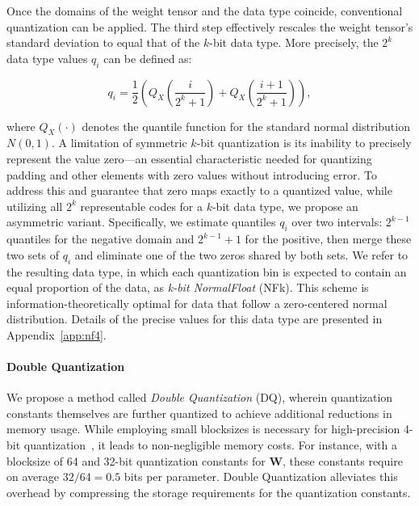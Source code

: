 Once the domains of the weight tensor and the data type coincide, conventional quantization can be applied. The third step effectively rescales the weight tensor’s standard deviation to equal that of the $k$-bit data type. More precisely, the $2^k$ data type values $q_i$ can be defined as:

\begin{equation}
q_i  = \frac{1}{2}\left( Q_X\left(\frac{i}{2^k+1}\right) + Q_X\left(\frac{i+1}{2^k+1}\right)\right),
\end{equation}

where $Q_X(\cdot)$ denotes the quantile function for the standard normal distribution $N(0,1)$. A limitation of symmetric $k$-bit quantization is its inability to precisely represent the value zero—an essential characteristic needed for quantizing padding and other elements with zero values without introducing error. To address this and guarantee that zero maps exactly to a quantized value, while utilizing all $2^k$ representable codes for a $k$-bit data type, we propose an asymmetric variant. Specifically, we estimate quantiles $q_i$ over two intervals: $2^{k-1}$ quantiles for the negative domain and $2^{k-1}+1$ for the positive, then merge these two sets of $q_i$ and eliminate one of the two zeros shared by both sets. We refer to the resulting data type, in which each quantization bin is expected to contain an equal proportion of the data, as \emph{k-bit NormalFloat} (NFk). This scheme is information-theoretically optimal for data that follow a zero-centered normal distribution. Details of the precise values for this data type are presented in Appendix~\ref{app:nf4}.

\paragraph{Double Quantization{}}
We propose a method called \emph{Double Quantization} (DQ), wherein quantization constants themselves are further quantized to achieve additional reductions in memory usage. While employing small blocksizes is necessary for high-precision 4-bit quantization~\citep{dettmers2022case}, it leads to non-negligible memory costs. For instance, with a blocksize of 64 and 32-bit quantization constants for $\mathbf{W}$, these constants require on average $32/64 = 0.5$ bits per parameter. Double Quantization alleviates this overhead by compressing the storage requirements for the quantization constants.

